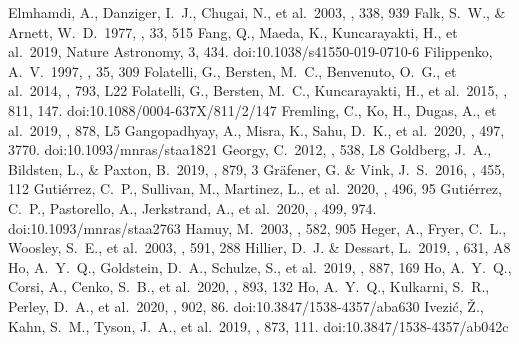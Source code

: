 \documentclass[twocolumn, linenumbers]{aastex62}
\begin{document}
\begin{thebibliography}{99}
  Elmhamdi, A., Danziger, I.~J., Chugai, N., et al.\ 2003, \mnras, 338, 939
 Falk, S.~W., \& Arnett, W.~D.\ 1977, \apjs, 33, 515
 Fang, Q., Maeda, K., Kuncarayakti, H., et al.\ 2019, Nature Astronomy, 3, 434. doi:10.1038/s41550-019-0710-6
 Filippenko, A.~V.\ 1997, \araa, 35, 309
 Folatelli, G., Bersten, M.~C., Benvenuto, O.~G., et al.\ 2014, \apjl, 793, L22
 Folatelli, G., Bersten, M.~C., Kuncarayakti, H., et al.\ 2015, \apj, 811, 147. doi:10.1088/0004-637X/811/2/147
 Fremling, C., Ko, H., Dugas, A., et al.\ 2019, \apjl, 878, L5
 Gangopadhyay, A., Misra, K., Sahu, D.~K., et al.\ 2020, \mnras, 497, 3770. doi:10.1093/mnras/staa1821
 Georgy, C.\ 2012, \aap, 538, L8
 Goldberg, J.~A., Bildsten, L., \& Paxton, B.\ 2019, \apj, 879, 3
 Gr{\"a}fener, G. \& Vink, J.~S.\ 2016, \mnras, 455, 112
 Guti{\'e}rrez, C.~P., Sullivan, M., Martinez, L., et al.\ 2020, \mnras, 496, 95
 Guti{\'e}rrez, C.~P., Pastorello, A., Jerkstrand, A., et al.\ 2020, \mnras, 499, 974. doi:10.1093/mnras/staa2763
 Hamuy, M.\ 2003, \apj, 582, 905
 Heger, A., Fryer, C.~L., Woosley, S.~E., et al.\ 2003, \apj, 591, 288
 Hillier, D.~J. \& Dessart, L.\ 2019, \aap, 631, A8
 Ho, A.~Y.~Q., Goldstein, D.~A., Schulze, S., et al.\ 2019, \apj, 887, 169
 Ho, A.~Y.~Q., Corsi, A., Cenko, S.~B., et al.\ 2020, \apj, 893, 132
 Ho, A.~Y.~Q., Kulkarni, S.~R., Perley, D.~A., et al.\ 2020, \apj, 902, 86. doi:10.3847/1538-4357/aba630
 Ivezi{\'c}, {\v{Z}}., Kahn, S.~M., Tyson, J.~A., et al.\ 2019, \apj, 873, 111. doi:10.3847/1538-4357/ab042c

\end{thebibliography}
\end{document}
